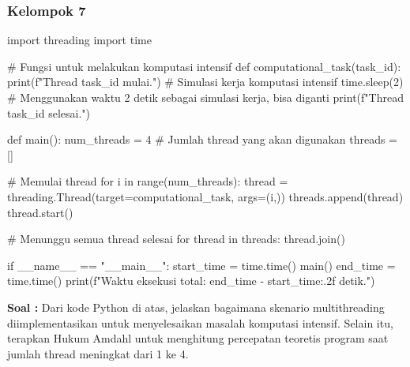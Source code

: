 \documentclass[12pt]{article}
\begin{document}
\subsubsection{Kelompok 7}
\begin{python}
    import threading
import time

# Fungsi untuk melakukan komputasi intensif
def computational_task(task_id):
    print(f"Thread {task_id} mulai.")
    # Simulasi kerja komputasi intensif
    time.sleep(2)  # Menggunakan waktu 2 detik sebagai simulasi kerja, bisa diganti
    print(f"Thread {task_id} selesai.")

def main():
    num_threads = 4  # Jumlah thread yang akan digunakan
    threads = []

    # Memulai thread
    for i in range(num_threads):
        thread = threading.Thread(target=computational_task, args=(i,))
        threads.append(thread)
        thread.start()

    # Menunggu semua thread selesai
    for thread in threads:
        thread.join()

if __name__ == "__main__":
    start_time = time.time()
    main()
    end_time = time.time()
    print(f"Waktu eksekusi total: {end_time - start_time:.2f} detik.")
\end{python}

\textbf{Soal : }
Dari kode Python di atas, jelaskan bagaimana skenario multithreading diimplementasikan untuk menyelesaikan masalah komputasi intensif. Selain itu, terapkan Hukum Amdahl untuk menghitung percepatan teoretis program saat jumlah thread meningkat dari 1 ke 4. \\
\end{document}
